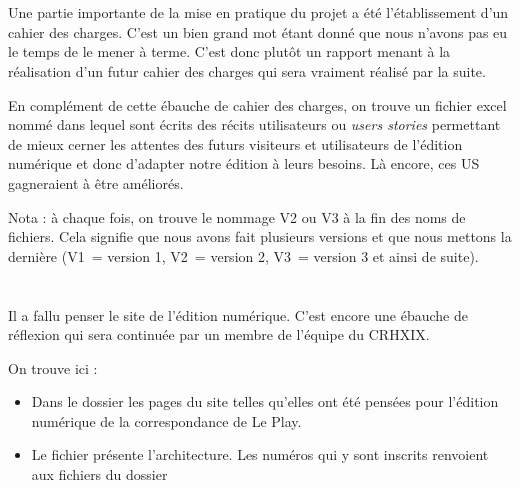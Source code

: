 \section{}

Une partie importante de la mise en pratique du projet a été l'établissement d'un cahier des charges. C'est un bien grand mot étant donné que nous n'avons pas eu le temps de le mener à terme. 
C'est donc plutôt un rapport menant à la réalisation d'un futur cahier des charges qui sera vraiment réalisé par la suite.

En complément de cette ébauche de cahier des charges, on trouve un fichier excel nommé  dans lequel sont écrits des récits utilisateurs ou \emph{users stories} permettant de mieux cerner les attentes des futurs visiteurs et utilisateurs de l'édition numérique et donc d'adapter notre édition à leurs besoins. 
Là encore, ces US gagneraient à être améliorés.

Nota : à chaque fois, on trouve le nommage V2 ou V3 à la fin des noms de fichiers. Cela signifie que nous avons fait plusieurs versions et que nous mettons la dernière (V1~= version 1, V2~= version 2, V3~= version 3 et ainsi de suite).

\section{}

Il a fallu penser le site de l'édition numérique.
C'est encore une ébauche de réflexion qui sera continuée par un membre de l'équipe du CRHXIX.

On trouve ici :
\begin{itemize}
    \item Dans le dossier  les pages du site telles qu'elles ont été pensées pour l'édition numérique de la correspondance de Le Play.
    \item Le fichier  présente l'architecture. Les numéros qui y sont inscrits renvoient aux fichiers du dossier 
\end{itemize}


\section{}

